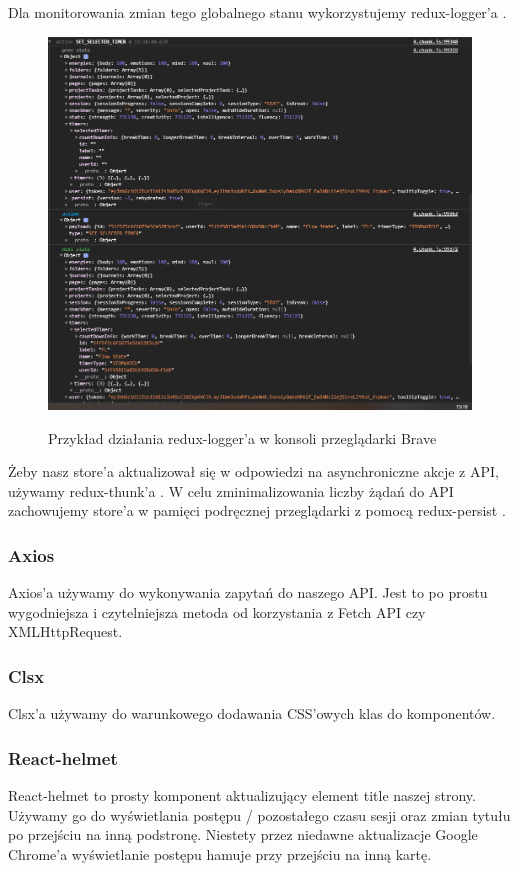 \documentclass[a4paper,11pt]{report}
\begin{document}
Dla monitorowania zmian tego globalnego stanu wykorzystujemy redux-logger'a \cite{redux-logger}.
\begin{figure}[H]
	\centering
	\includegraphics[scale=0.55]{implementacja/frontend/redux_logger}\\
	\caption{Przykład działania redux-logger'a w konsoli przeglądarki Brave}
	\label{fig:redux_logger}
\end{figure}
Żeby nasz store'a aktualizował się w odpowiedzi na asynchroniczne akcje z API, używamy redux-thunk'a \cite{redux-thunk}.
W celu zminimalizowania liczby żądań do API zachowujemy store'a w pamięci podręcznej przeglądarki z pomocą redux-persist \cite{redux-persist}.

\subsubsection{Axios}
Axios'a \cite{axios} używamy do wykonywania zapytań do naszego API.
 Jest to po prostu wygodniejsza i czytelniejsza metoda od korzystania z Fetch API czy XMLHttpRequest.
\subsubsection{Clsx}
Clsx'a \cite{clsx} używamy do warunkowego dodawania CSS'owych klas do komponentów.

\subsubsection{React-helmet}
React-helmet\cite{react-helmet} to prosty komponent aktualizujący element title naszej strony.
 Używamy go do wyświetlania postępu / pozostałego czasu sesji oraz zmian tytułu po przejściu na inną podstronę.
 Niestety przez niedawne aktualizacje Google Chrome'a wyświetlanie postępu hamuje przy przejściu na inną kartę.
\end{document}
